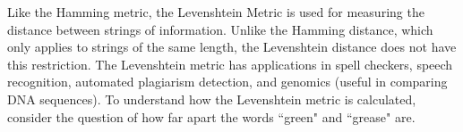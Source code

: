 \begin{comment}

\ActivitySolution

\ba

\item Since $c_2$ and $c_8$ differ only in the third and fourth components, we have that $d_H(c_2,c_8) = 2$. 

\item Suppose we receive the message 
\begin{equation} \label{eq:message}
(0,0,0,1,1,1) \ (0,0,0,1,0,0) \ (0,0,1,1,1,0) \ (0,0,0,0,1,1) \ (0,0,1,0,0,1).
\end{equation} 
	\begin{enumerate}[i.]
	\item Note that $(0,0,0,1,1,1)$, $(0,0,0,1,0,0)$, and $(0,0,1,1,1,0)$ are not in $C$. Since $C$ contains all of the possible words in our message, we know that there are errors in our message. 

	\item 
	\begin{itemize}
	\item The code words closest to $(0,0,0,1,1,1)$ are $c_2$, $c_3$, $c_5$, and $c_8$, which are all a distance $1$ from $(0,0,0,1,1,1)$. 
	\item The code words closest to $(0,0,0,1,0,0)$ are $c_1$, $c_3$, $c_5$, and $c_7$, which are all a distance $1$ from $(0,0,0,1,0,0)$.
	\item The code words closest to $(0,0,1,1,1,0)$ are $c_6$, $c_7$, and $c_8$, which are all a distance $1$ from $(0,0,1,1,1,0)$.
	\end{itemize}
	


$c_1 = (0,0,0,0,0,0)$, 	&$c_2=(0,0,0,0,1,1)$, 	&$c_3=(0,0,0,1,0,1)$, 	&$c_4=(0,0,1,0,0,1)$, \\
$c_5=(0,0,0,1,1,0)$, 		&$c_6=(0,0,1,0,1,0)$, 	&$c_7=(0,0,1,1,0,0)$, 	&$c_8=(0,0,1,1,1,1)$

	\end{enumerate}

\ea

\end{comment}


\label{sec_levenshtein_app}

Like the Hamming metric, the Levenshtein Metric is used for measuring the distance between strings of information. Unlike the Hamming distance, which only applies to strings of the same length, the Levenshtein distance does not have this restriction. The Levenshtein metric has applications in spell checkers, speech recognition, automated plagiarism detection, and genomics (useful in comparing DNA sequences). To understand how the Levenshtein metric is calculated, consider the question of how far apart the words ``green" and ``grease" are.

